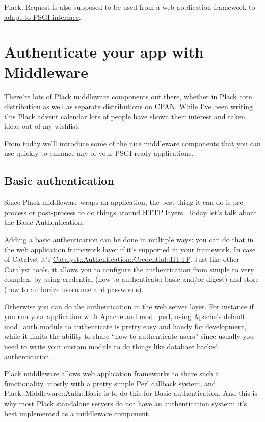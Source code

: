 Plack::Request is also supposed to be used from a web application
framework to
\href{http://advent.plackperl.org/2009/12/day-8-adapting-web-frameworks-to-psgi.html}{adapt
to PSGI interface}.

\chapter{Authenticate your app with
Middleware}\label{day-15-authenticate-your-app-with-middleware}

There're lots of Plack middleware components out there, whether in Plack
core distribution as well as separate distributions on CPAN. While I've
been writing this Plack advent calendar lots of people have shown their
interest and taken ideas out of my wishlist.

From today we'll introduce some of the nice middleware components that
you can use quickly to enhance any of your PSGI ready applications.

\section{Basic authentication}\label{basic-authentication}

Since Plack middleware wraps an application, the best thing it can do is
pre-process or post-process to do things around HTTP layers. Today let's
talk about the Basic Authentication.

Adding a basic authentication can be done in multiple ways: you can do
that in the web application framework layer if it's supported in your
framework. In case of Catalyst it's
\href{http://search.cpan.org/perldoc?Catalyst::Authentication::Credential::HTTP}{Catalyst::Authentication::Credential::HTTP}.
Just like other Catalyst tools, it allows you to configure the
authentication from simple to very complex, by using credential (how to
authenticate: basic and/or digest) and store (how to authorize username
and passwords).

Otherwise you can do the authentication in the web server layer. For
instance if you run your application with Apache and mod\_perl, using
Apache's default mod\_auth module to authenticate is pretty easy and
handy for development, while it limits the ability to share ``how to
authenticate users'' since usually you need to write your custom module
to do things like database backed authentication.

Plack middleware allows web application frameworks to share such a
functionality, mostly with a pretty simple Perl callback system, and
Plack::Middleware::Auth::Basic is to do this for Basic authentication.
And this is why most Plack standalone servers do not have an
authentication system: it's best implemented as a middleware component.

